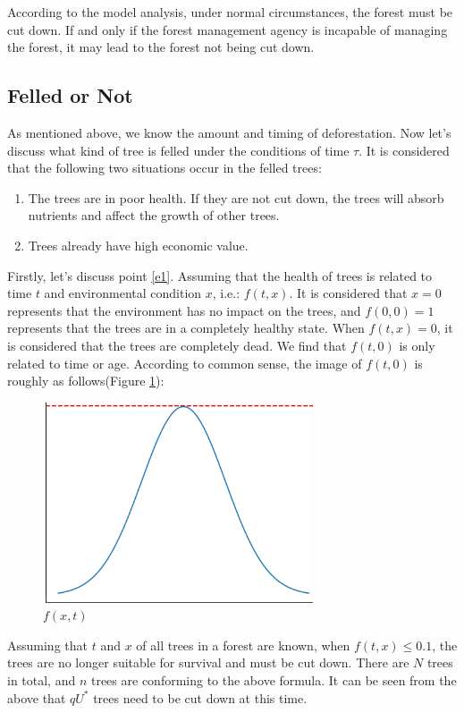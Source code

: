 \documentclass[12pt]{article}
\begin{document}
According to the model analysis, under normal circumstances, the forest must be
cut down. If and only if the forest management agency is incapable of managing
the forest, it may lead to the forest not being cut down.

\subsection{Felled or Not}
As mentioned above, we know the amount and timing of deforestation. Now let’s
discuss what kind of tree is felled under the conditions of time $\tau$. It is
considered that the following two situations occur in the felled trees:
\begin{enumerate}
    \item The trees are in poor health. If they are not cut down, the trees will absorb
          nutrients and affect the growth of other trees.\label{e1}%
    \item Trees already have high economic value.\label{e2}
\end{enumerate}

Firstly, let's discuss point \ref{e1}. Assuming that the health of trees is
related to time $t$ and environmental condition $x$, i.e.: $f(t,x)$. It is
considered that $x=0$ represents that the environment has no impact on the
trees, and $f(0,0)=1$ represents that the trees are in a completely healthy
state. When $f(t,x)=0$, it is considered that the trees are completely dead. We
find that $f(t,0)$ is only related to time or age. According to common sense,
the image of $f(t,0)$ is roughly as follows(Figure \ref{F1}):
\begin{figure}[htb]
    \centering
    \includegraphics[width=8cm]{ftx.png}
    \caption{$f(x,t)$}\label{F1}
\end{figure}
Assuming that $t$ and $x$ of all trees in a forest are known,
when $f (t, x) \leqslant 0.1$, the trees are no longer suitable for survival and must be cut down.
There are $N$ trees in total, and $n$ trees are conforming to the above formula.
It can be seen from the above that $qU^*$ trees need to be cut down at this time.
\end{document}

